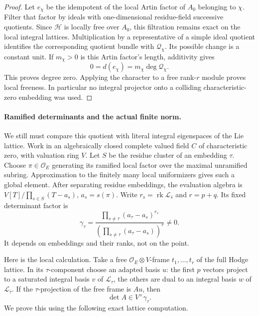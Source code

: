\begin{proof}
Let \(e_\chi\) be the idempotent of the local Artin factor
of \(A_0\) belonging to \(\chi\).
Filter that factor by ideals with one-dimensional residue-field
successive quotients.
Since \(\mathcal H\) is locally free over \(A_0\), this
filtration remains exact on the local integral lattices.
Multiplication by a representative of a simple ideal
quotient identifies the corresponding quotient bundle with
\(\mathcal Q_\chi\).
Its possible change is a constant unit.
If \(m_\chi>0\) is this Artin factor's length, additivity gives
\[
                       0=d(e_\chi)=m_\chi\deg\mathcal Q_\chi.
\]
This proves degree zero.
Applying the character to a free rank-\(r\) module proves
local freeness.  In particular no integral projector onto
a colliding characteristic-zero embedding was used.
\end{proof}

\paragraph{Ramified determinants and the actual finite norm.}
We still must compare this quotient with literal integral
eigenspaces of the Lie lattice.
Work in an algebraically closed complete valued field \(C\)
of characteristic zero, with valuation ring \(V\).
Let \(S\) be the residue cluster of an embedding \(\tau\).
Choose \(\pi\in\mathcal O_E\) generating its ramified local
factor over the maximal unramified subring.
Approximation to the finitely many local uniformizers gives
such a global element.
After separating residue embeddings, the evaluation algebra is
\(V[T]/\prod_{s\in S}(T-a_s)\), \(a_s=s(\pi)\).
Write \(r_s=\operatorname{rk}\mathcal L_{\bar s}\) and \(r=p+q\).
Its fixed determinant factor is
\[
 \gamma_\tau=
  \frac{\prod_{s\ne\tau}(a_\tau-a_s)^{r_s}}
       {\left(\prod_{s\ne\tau}(a_\tau-a_s)\right)^r}\ne0 .
 \tag{FD26}
\]
It depends on embeddings and their ranks, not on the point.

Here is the local calculation.
Take a free \(\mathcal O_E\otimes V\)-frame \(t_1,\ldots,t_r\)
of the full Hodge lattice.
In its \(\tau\)-component choose an adapted basis \(u\):
the first \(p\) vectors project to a saturated integral
basis \(v\) of \(\mathcal L_\tau\), the others are dual to
an integral basis \(w\) of \(\mathcal L_{\bar\tau}\).
If the \(\tau\)-projection of the free frame is \(A u\), then
\[
                              \det A\in V^\times\gamma_\tau .
 \tag{FD27}
\]
We prove this using the following exact lattice computation.

